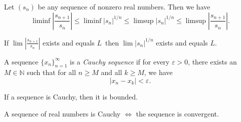 \documentclass[../main.tex]{subfiles}
\begin{document}
    
    
    
    
    
    
    \begin{exercise}
    Let $(s_n)$ be any sequence of nonzero real numbers. Then we have
    \[
    \liminf \left| \frac{s_{n+1}}{s_n} \right| 
    \leq \liminf |s_n|^{1/n} 
    \leq \limsup |s_n|^{1/n} 
    \leq \limsup \left| \frac{s_{n+1}}{s_n} \right|.
    \]
    
    \end{exercise}
    
    
    
    
    \begin{exercise}
    If \(\lim \left| \frac{s_{n+1}}{s_n} \right|\) exists and equals \(L\)\, then \(\lim |s_n|^{1/n}\) exists and equals \(L\).
    
    \end{exercise}
    
    
    
    
    
    
    
    
    
    
    
    
    
    
    
    
    \begin{definition}\label{def:cauchy_sequence}
    A sequence \( \{x_n\}_{n=1}^{\infty} \) is a \textit{Cauchy sequence} if for every \( \varepsilon > 0 \), there exists an \( M \in \mathbb{N} \) such that for all \( n \geq M \) and all \( k \geq M \), we have
    \[
    |x_n - x_k| < \varepsilon.
    \]
    \end{definition}
    
    
    
    
    
    
    
    
    
    \begin{lemma}
    If a sequence is Cauchy, then it is bounded. 
    \end{lemma}
    
    
    
    
    \begin{theorem}\label{thm:cauchy_convergence}
    A sequence of real numbers is Cauchy $ \iff$ the sequence is convergent. 
        
    \end{theorem}
    
\end{document}

